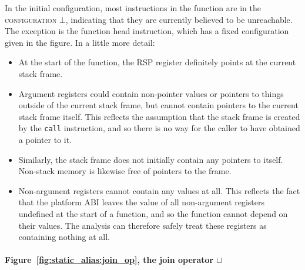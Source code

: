 In the initial configuration, most instructions in the function are in
the \textsc{configuration} $\bot$, indicating that they are currently
believed to be unreachable.  The exception is the function head
instruction, which has a fixed configuration given in the figure.
In a little more detail:

\begin{itemize}
\item At the start of the function, the \textsc{RSP} register
  definitely points at the current stack frame.
\item Argument registers could contain non-pointer values or pointers
  to things outside of the current stack frame, but cannot contain
  pointers to the current stack frame itself.  This reflects the
  assumption that the stack frame is created by the \texttt{call}
  instruction, and so there is no way for the caller to have obtained
  a pointer to it.
\item Similarly, the stack frame does not initially contain any
  pointers to itself.  Non-stack memory is likewise free of pointers
  to the frame.
\item Non-argument registers cannot contain any values at all.  This
  reflects the fact that the platform ABI leaves the value of all
  non-argument registers undefined at the start of a function, and so
  the function cannot depend on their values.  The analysis can
  therefore safely treat these registers as containing nothing at all.
\end{itemize}

\paragraph{Figure~\ref{fig:static_alias:join_op}, the join operator $\sqcup$}

